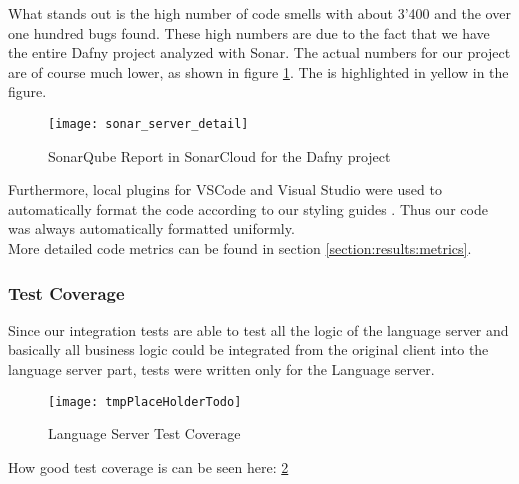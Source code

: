 What stands out is the high number of code smells with about 3'400
and the over one hundred bugs found.
These high numbers are due to the fact that we have the entire Dafny project analyzed with Sonar.
The actual numbers for our project are of course much lower,
as shown in figure \ref{fig:sonar_server_detail}.
The  is highlighted in yellow in the figure.

\begin{figure}[H]
    \centering
    \texttt{[image: sonar\_server\_detail]}
    \caption{SonarQube Report in SonarCloud for the Dafny project}
    \label{fig:sonar_server_detail}
\end{figure}

Furthermore, local plugins for VSCode and Visual Studio were used to automatically
format the code according to our styling guides \cite{dev}.
Thus our code was always automatically formatted uniformly. \\

More detailed code metrics can be found in section \ref{section:results:metrics}.

\subsubsection{Test Coverage}
Since our integration tests are able to test all the logic of the language server
and basically all business logic could be integrated from the original client into the language server part,
tests were written only for the Language server.

\begin{figure}[H]
    \centering
    \texttt{[image: tmpPlaceHolderTodo]}
    \caption{Language Server Test Coverage}
    \label{fig:test_coverage}
\end{figure}

How good test coverage is can be seen here: \ref{fig:test_coverage}
